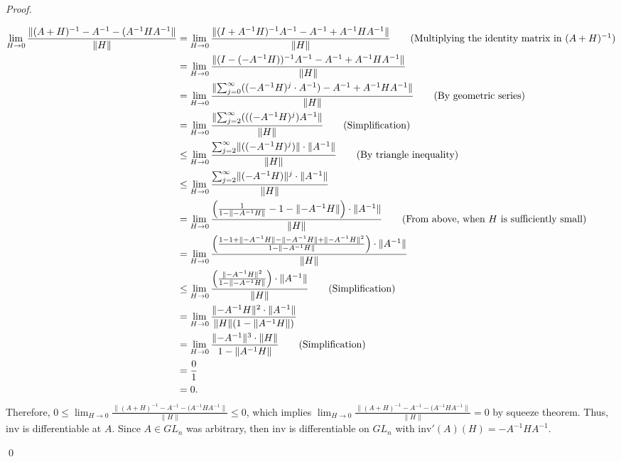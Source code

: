 \documentclass[12pt]{article}
\newenvironment{sol}
    {\emph{Proof.}
    }
    {
    \qed
    }
\begin{document}
\begin{sol}
\begin{align*}
      \lim_{H \to 0}\frac{\lVert (A+H)^{-1} - A^{-1} - (A^{-1}HA^{-1} \rVert}{\lVert H \rVert} &= \lim_{H \to 0} \frac{\lVert(I + A^{-1}H)^{-1}A^{-1} - A^{-1} + A^{-1}HA^{-1} \rVert}{\lVert H \rVert} \tag*{(Multiplying the identity matrix in $(A + H)^{-1})$} \\ &= \lim_{H \to 0} \frac{\lVert (I - (-A^{-1}H))^{-1}A^{-1} - A^{-1} + A^{-1}HA^{-1} \rVert}{\lVert H \rVert} \\ &= \lim_{H \to 0} \frac{\lVert \sum_{j = 0}^\infty ((-A^{-1}H)^j \cdot A^{-1}) - A^{-1} + A^{-1}HA^{-1} \rVert}{\lVert H \rVert} \tag*{(By geometric series)} \\ &= \lim_{H \to 0} \frac{\lVert \sum_{j = 2}^\infty (((-A^{-1}H)^j)A^{-1} \rVert}{\lVert H \rVert} \tag*{(Simplification)} \\ &\leq \lim_{H \to 0} \frac{\sum_{j = 2}^\infty \lVert ((-A^{-1}H)^j) \rVert \cdot \lVert A^{-1} \rVert}{\lVert H \rVert} \tag*{(By triangle inequality)} \\ &\leq \lim_{H \to 0} \frac{\sum_{j = 2}^\infty \lVert (-A^{-1}H) \rVert^j \cdot \lVert A^{-1} \rVert}{\lVert H \rVert} \\ &= \lim_{H \to 0} \frac{\left( \frac{1}{1 - \lVert -A^{-1}H \rVert} - 1 - \lVert -A^{-1}H \rVert \right) \cdot \lVert A^{-1} \rVert}{\lVert H \rVert} \tag*{(From above, when $H$ is sufficiently small)} \\ &= \lim_{H \to 0} \frac{ \left( \frac{1-1 + \lVert -A^{-1}H \rVert - \lVert -A^{-1}H \rVert + \lVert-A^{-1}H \rVert^2}{1-\lVert - A^{-1}H \rVert} \right) \cdot \lVert A^{-1} \rVert}{\lVert H \rVert} \\ &\leq \lim_{H \to 0}\frac{ \left( \frac{\lVert -A^{-1}H \rVert^2}{1- \lVert -A^{-1}H \rVert} \right) \cdot \lVert A^{-1} \rVert}{\lVert H \rVert} \tag*{(Simplification)} \\ &= \lim_{H \to 0} \frac{\lVert -A^{-1}H \rVert^2 \cdot \lVert A^{-1} \rVert}{\lVert H \rVert ( 1 - \lVert A^{-1}H \rVert)} \\ &= \lim_{H \to 0} \frac{\lVert -A^{-1} \rVert^3 \cdot \lVert H \rVert}{1 - \lVert A^{-1}H \rVert} \tag*{(Simplification)} \\ &= \frac{0}{1} \\ &= 0.  
  \end{align*}
  Therefore, $0 \leq \lim_{H \to 0}\frac{\lVert (A+H)^{-1} - A^{-1} - (A^{-1}HA^{-1} \rVert}{\lVert H \rVert} \leq 0$, which implies $\lim_{H \to 0}\frac{\lVert (A+H)^{-1} - A^{-1} - (A^{-1}HA^{-1} \rVert}{\lVert H \rVert} = 0$ by squeeze theorem. Thus, $\text{inv}$ is differentiable at $A$. Since $A \in GL_n$ was arbitrary, then $\text{inv}$ is differentiable on $GL_n$ with $\text{inv}'(A)(H) = -A^{-1}HA^{-1}$.
  
  \end{sol}
\end{document}
